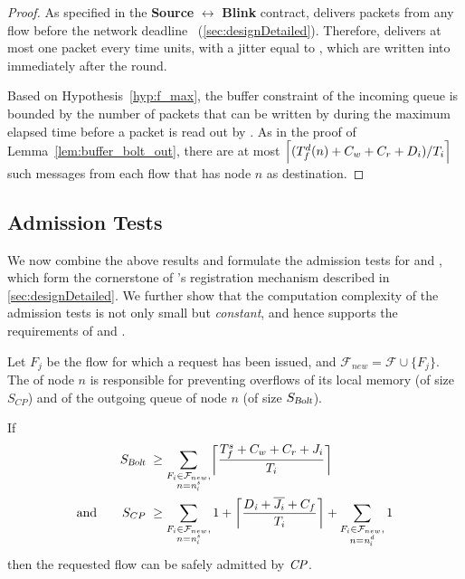\begin{proof}%
As specified in the \textbf{Source} $\boldsymbol{\leftrightarrow}$ \textbf{Blink} contract, \blink delivers packets from any flow \flowi before the network deadline \ndeadlinei~(\cref{sec:designDetailed}). Therefore, \blink delivers at most one packet every \periodi time units, with a jitter equal to \ndeadlinei, which are written into \bolt immediately after the round.

Based on Hypothesis~\ref{hyp:f_max},
the buffer constraint of the incoming \bolt queue is bounded by the number of packets that can be written by \cpdst during the maximum elapsed time before a packet is read out by \apdst. As in the proof of Lemma~\ref{lem:buffer_bolt_out}, there are at most $\ceil*{(T_f^d(n) + C_w + C_r + D_i)/{T_i}}$ such messages from each flow \flowi that has node $n$ as destination.
\end{proof}


\subsection{Admission Tests}
\label{subsec:admission}

We now combine the above results and formulate the admission tests for \CPs and \APs, which form the cornerstone of \DRP's registration mechanism described in \cref{sec:designDetailed}.
We further show that the computation complexity of the admission tests is not only small but \emph{constant}, and hence supports the requirements of  and .

Let $F_j$ be the flow for which a request has been issued, and $\mathcal{F}_{new} = \mathcal{F} \cup \{F_j\}$.
The \cp of node $n$ is responsible for preventing overflows of its local memory (of size $S_{CP}$) and of the outgoing \bolt queue of node $n$ (of size $S_{\bolt}$).

\begin{theorem}\label{thm:CP}
If
\begin{align*}
S_{\bolt} \;
	 & \geq \sum_{\substack{\flowi \in \mathcal{F}_{new}, \\ n = \flowsrci}}
	 	\ceil*{\frac{T_f^s + C_w + C_r + \jitteri}{T_i}} \\
\textup{and}\qquad
S_{CP} \;
 	& \geq
	\sum_{\substack{\flowi \in \mathcal{F}_{new}, \\ n = \flowsrci}}
		1 + \ceil*{\frac{\ndeadlinei + \overline{\jitteri} + C_f}{T_i}}
	+ \sum_{\substack{\flowi \in \mathcal{F}_{new}, \\ n = \flowdsti}}
		1
\end{align*}
then the requested flow \flowj can be safely admitted by $\cp$.
\end{theorem}

